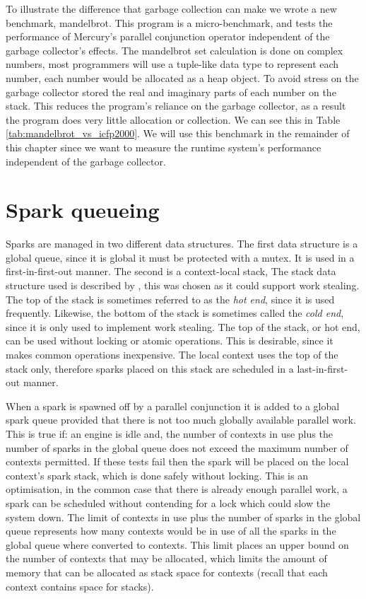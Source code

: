 To illustrate the difference that garbage collection can make we wrote a new
benchmark, mandelbrot.
This program is a micro-benchmark, and tests the performance of 
Mercury's parallel conjunction operator independent of the garbage
collector's effects.
The mandelbrot set calculation is done on complex numbers,
most programmers will use a tuple-like data type to represent each number,
each number would be allocated as a heap object.
To avoid stress on the garbage collector stored the real and imaginary parts
of each number on the stack.
This reduces the program's reliance on the garbage collector,
as a result the program does very little allocation or collection.
We can see this in Table \ref{tab:mandelbrot_vs_icfp2000}.
We will use this benchmark in the remainder of this chapter since we want to
measure the runtime system's performance independent of the garbage collector.

\section{Spark queueing}


Sparks are managed in two different data structures.
The first data structure is a global queue,
since it is global it must be protected with a mutex.
It is used in a first-in-first-out manner.
The second is a context-local stack,
The stack data structure used is described by \citet{workstealing_queue},
this was chosen as it could support work stealing.
The top of the stack is sometimes referred to as the \emph{hot end},
since it is used frequently.
Likewise, the bottom of the stack is sometimes called the
\emph{cold end}, since it is only used to implement work stealing.
The top of the stack, or hot end, can be used without locking or atomic
operations.
This is desirable, since it makes common operations inexpensive.
The local context uses the top of the stack only,
therefore sparks placed on this stack are scheduled in a
last-in-first-out manner.

When a spark is spawned off by a parallel conjunction
it is added to a global spark queue provided that there is not too much
globally available parallel work.
This is true if:
an engine is idle and,
the number of contexts in use plus the number of sparks in the global queue
does not exceed the maximum number of contexts permitted.
If these tests fail then the spark will be placed on the local context's
spark stack,
which is done safely without locking.
This is an optimisation,
in the common case that there is already enough parallel work,
a spark can be scheduled without contending for a lock which could slow the
system down.
The limit of contexts in use plus the number of sparks in the global queue
represents how many contexts would be in use of all the sparks in the global
queue where converted to contexts.
This limit places an upper bound on the number of contexts that may be
allocated,
which limits the amount of memory that can be allocated as stack space for
contexts
(recall that each context contains space for stacks).

